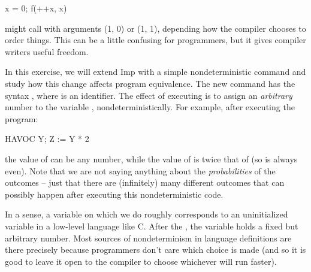 \documentclass[12pt]{report}
\begin{document}
      x = 0;
      f(++x, x)


    might call  with arguments (1, 0) or (1, 1), depending how
    the compiler chooses to order things.  This can be a little
    confusing for programmers, but it gives compiler writers useful
    freedom.


    In this exercise, we will extend Imp with a simple
    nondeterministic command and study how this change affects
    program equivalence.  The new command has the syntax  ,
    where  is an identifier. The effect of executing   is
    to assign an \textit{arbitrary} number to the variable ,
    nondeterministically. For example, after executing the program:


      HAVOC Y;
      Z := Y * 2


    the value of  can be any number, while the value of  is
    twice that of  (so  is always even). Note that we are not
    saying anything about the \textit{probabilities} of the outcomes -- just
    that there are (infinitely) many different outcomes that can
    possibly happen after executing this nondeterministic code.


    In a sense, a variable on which we do  roughly corresponds
    to an uninitialized variable in a low-level language like C.  After
    the , the variable holds a fixed but arbitrary number.  Most
    sources of nondeterminism in language definitions are there
    precisely because programmers don't care which choice is made (and
    so it is good to leave it open to the compiler to choose whichever
    will run faster).
\end{document}
